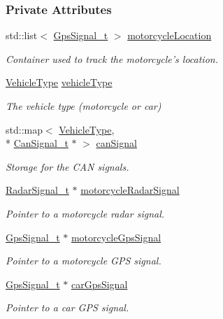\subsubsection*{Private Attributes}
\begin{DoxyCompactItemize}
\item 
std\-::list$<$ \hyperlink{structGpsSignal__t}{Gps\-Signal\-\_\-t} $>$ \hyperlink{classMotorcycleAwarenessSystem_af6becfeb1d11b467cb80a94a8e6940ac}{motorcycle\-Location}
\begin{DoxyCompactList}\small\item\em Container used to track the motorcycle's location. \end{DoxyCompactList}\item 
\hyperlink{MotorcycleAwarenessSystemTypes_8hpp_a0c05c42b98a847f971385c81c2a81afa}{Vehicle\-Type} \hyperlink{classMotorcycleAwarenessSystem_a977b2085bfbf6a62902bf2d80160e6d2}{vehicle\-Type}
\begin{DoxyCompactList}\small\item\em The vehicle type (motorcycle or car) \end{DoxyCompactList}\item 
std\-::map$<$ \hyperlink{MotorcycleAwarenessSystemTypes_8hpp_a0c05c42b98a847f971385c81c2a81afa}{Vehicle\-Type}, \\*
\hyperlink{structCanSignal__t}{Can\-Signal\-\_\-t} $\ast$ $>$ \hyperlink{classMotorcycleAwarenessSystem_a2d8ac602ae24dcf38aaa95a42ffb4e1f}{can\-Signal}
\begin{DoxyCompactList}\small\item\em Storage for the C\-A\-N signals. \end{DoxyCompactList}\item 
\hyperlink{structRadarSignal__t}{Radar\-Signal\-\_\-t} $\ast$ \hyperlink{classMotorcycleAwarenessSystem_a0744e71b9f440a86f5078c876ba7629b}{motorcycle\-Radar\-Signal}
\begin{DoxyCompactList}\small\item\em Pointer to a motorcycle radar signal. \end{DoxyCompactList}\item 
\hyperlink{structGpsSignal__t}{Gps\-Signal\-\_\-t} $\ast$ \hyperlink{classMotorcycleAwarenessSystem_ab281a3993b574923b2f379ed0477b2d4}{motorcycle\-Gps\-Signal}
\begin{DoxyCompactList}\small\item\em Pointer to a motorcycle G\-P\-S signal. \end{DoxyCompactList}\item 
\hyperlink{structGpsSignal__t}{Gps\-Signal\-\_\-t} $\ast$ \hyperlink{classMotorcycleAwarenessSystem_a9a8185e00b60d0be58bfa76166063128}{car\-Gps\-Signal}
\begin{DoxyCompactList}\small\item\em Pointer to a car G\-P\-S signal. \end{DoxyCompactList}\end{DoxyCompactItemize}
